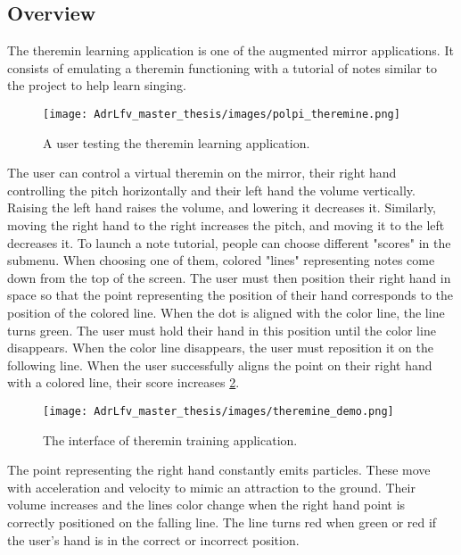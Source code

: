 \subsection{Overview}

The theremin learning application is one of the augmented mirror applications. It consists of emulating a theremin functioning with a tutorial of notes similar to the project to help learn singing. 

\begin{figure}[h]
    \centering
    \texttt{[image: AdrLfv\_master\_thesis/images/polpi\_theremine.png]}
    \caption{A user testing the theremin learning application.}
    \label{fig:polpi_theremine}
\end{figure}

The user can control a virtual theremin on the mirror, their right hand controlling the pitch horizontally and their left hand the volume vertically. Raising the left hand raises the volume, and lowering it decreases it. Similarly, moving the right hand to the right increases the pitch, and moving it to the left decreases it. 
To launch a note tutorial, people can choose different "scores" in the submenu. When choosing one of them, colored "lines" representing notes come down from the top of the screen.
The user must then position their right hand in space so that the point representing the position of their hand corresponds to the position of the colored line. When the dot is aligned with the color line, the line turns green. The user must hold their hand in this position until the color line disappears. When the color line disappears, the user must reposition it on the following line. When the user successfully aligns the point on their right hand with a colored line, their score increases \ref{fig:theremine_demo}.

\begin{figure}[h]
    \centering
    \texttt{[image: AdrLfv\_master\_thesis/images/theremine\_demo.png]}
    \caption{The interface of theremin training application.}
    \label{fig:theremine_demo}
\end{figure}

The point representing the right hand constantly emits particles. These move with acceleration and velocity to mimic an attraction to the ground. Their volume increases and the lines color change when the right hand point is correctly positioned on the falling line. The line turns red when green or red if the user's hand is in the correct or incorrect position.

